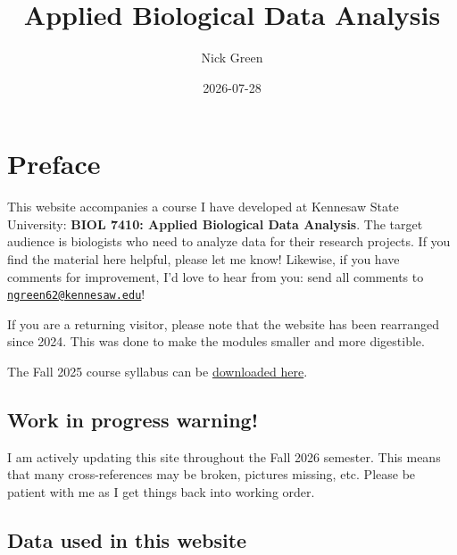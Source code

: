 \documentclass[
  13,
  letterpaper,
]{report}
\title{Applied Biological Data Analysis}
\author{Nick Green}
\date{2026-07-28}
\renewcommand*\contentsname{Table of contents}
\newcommand\contentsname{Table of contents}
\begin{document}
\maketitle

\renewcommand*\contentsname{Table of contents}
{
\hypersetup{linkcolor=}
\setcounter{tocdepth}{2}
\tableofcontents
}


\chapter*{Preface}\label{preface}


This website accompanies a course I have developed at Kennesaw State
University: \textbf{BIOL 7410: Applied Biological Data Analysis}. The
target audience is biologists who need to analyze data for their
research projects. If you find the material here helpful, please let me
know! Likewise, if you have comments for improvement, I'd love to hear
from you: send all comments to
\href{mailto:ngreen62@kennesaw.edu}{\nolinkurl{ngreen62@kennesaw.edu}}!

If you are a returning visitor, please note that the website has been
rearranged since 2024. This was done to make the modules smaller and
more digestible.

The Fall 2025 course syllabus can be
\href{https://greenquanteco.github.io/book/202503\%20biol\%207410\%20syllabus\%202025-08-05.pdf}{downloaded
here}.

\section*{Work in progress warning!}\label{work-in-progress-warning}


I am actively updating this site throughout the Fall 2026 semester. This
means that many cross-references may be broken, pictures missing, etc.
Please be patient with me as I get things back into working order.

\section*{Data used in this website}\label{data-used-in-this-website}
\end{document}
